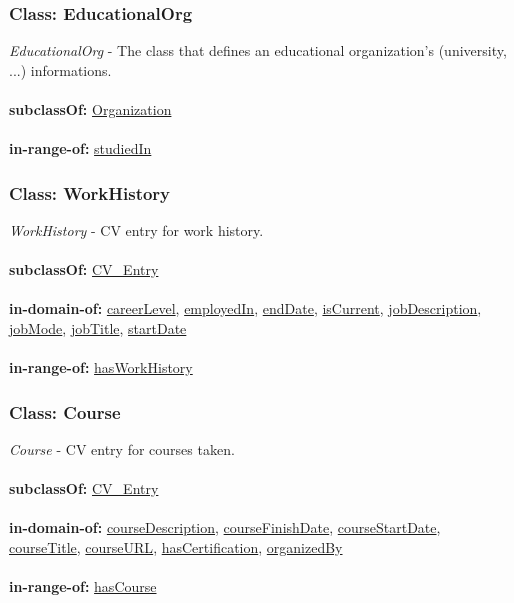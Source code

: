 \documentclass[a4paper,12pt]{article}
\numberwithin{equation}{section}
\begin{document}
\subsubsection{Class: EducationalOrg}\hypertarget{EducationalOrg}{}
\textit{EducationalOrg} - The class that defines an educational organization's (university, ...) informations.
\\\\
\textbf{subclassOf:} \hyperlink{Organization}{Organization}
\\\\
\textbf{in-range-of:} \hyperlink{studiedIn}{studiedIn}

\subsubsection{Class: WorkHistory}\hypertarget{WorkHistory}{}
\textit{WorkHistory} - CV entry for work history.
\\\\
\textbf{subclassOf:} \hyperlink{CV\_Entry}{CV\_Entry}
\\\\
\textbf{in-domain-of:} \hyperlink{careerLevel}{careerLevel}, \hyperlink{employedIn}{employedIn}, \hyperlink{endDate}{endDate}, \hyperlink{isCurrent}{isCurrent}, \hyperlink{jobDescription}{jobDescription}, \hyperlink{jobMode}{jobMode}, \hyperlink{jobTitle}{jobTitle}, \hyperlink{startDate}{startDate} 
\\\\
\textbf{in-range-of:} \hyperlink{hasWorkHistory}{hasWorkHistory}

\subsubsection{Class: Course}\hypertarget{Course}{}
\textit{Course} - CV entry for courses taken.
\\\\
\textbf{subclassOf:} \hyperlink{CV\_Entry}{CV\_Entry}
\\\\
\textbf{in-domain-of:} \hyperlink{courseDescription}{courseDescription}, \hyperlink{courseFinishDate}{courseFinishDate}, \hyperlink{courseStartDate}{courseStartDate}, \hyperlink{courseTitle}{courseTitle}, \hyperlink{courseURL}{courseURL}, \hyperlink{hasCertification}{hasCertification}, \hyperlink{organizedBy}{organizedBy}
\\\\
\textbf{in-range-of:} \hyperlink{hasCourse}{hasCourse}
\end{document}
